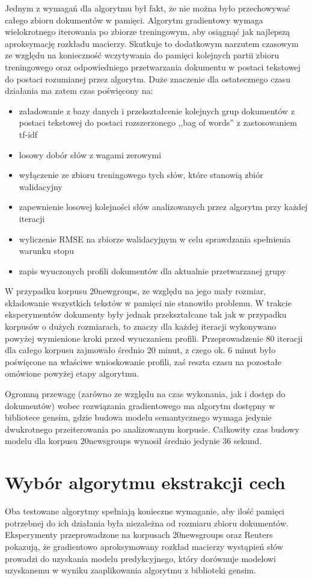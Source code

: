 \documentclass{pracamgr}
\begin{document}
Jednym  z  wymagań  dla  algorytmu  był  fakt,  że  nie  można  było  przechowywać  całego zbioru dokumentów w pamięci. Algorytm gradientowy wymaga wielokrotnego iterowania po zbiorze treningowym, aby osiągnąć jak najlepszą aproksymację rozkładu macierzy. Skutkuje to dodatkowym narzutem czasowym ze względu na konieczność wczytywania do pamięci kolejnych partii zbioru treningowego oraz odpowiedniego przetwarzania dokumentu w postaci tekstowej do postaci rozumianej przez algorytm. Duże znaczenie dla ostatecznego czasu działania ma zatem czas poświęcony na:

\begin{itemize}
    \item załadowanie z bazy danych i przekształcenie kolejnych grup dokumentów z postaci tekstowej do postaci rozszerzonego ,,bag of words'' z zastosowaniem tf-idf
    \item losowy dobór słów z wagami zerowymi
    \item wyłączenie ze zbioru treningowego tych słów, które stanowią zbiór walidacyjny
    \item zapewnienie losowej kolejności słów analizowanych przez algorytm przy każdej iteracji
    \item wyliczenie RMSE na zbiorze walidacyjnym w celu sprawdzania spełnienia warunku stopu
    \item zapis wyuczonych profili dokumentów dla aktualnie przetwarzanej grupy
\end{itemize}

W przypadku korpusu 20newgroups, ze względu na jego mały rozmiar, składowanie wszystkich tekstów w pamięci nie stanowiło problemu. W trakcie eksperymentów dokumenty były jednak przekształcane tak jak w przypadku korpusów o dużych rozmiarach, to znaczy dla każdej iteracji wykonywano powyżej wymienione kroki przed wyuczaniem profili. Przeprowadzenie 80 iteracji dla całego korpusu zajmowało średnio 20 minut, z czego ok. 6 minut było poświęcone na właściwe wnioskowanie profili, zaś reszta czasu na pozostałe omówione powyżej etapy algorytmu.

Ogromną przewagę (zarówno ze względu na czas wykonania, jak i dostęp do dokumentów) wobec rozwiązania gradientowego ma algorytm dostępny w bibliotece gensim, gdzie budowa modelu semantycznego wymaga jedynie dwukrotnego przeiterowania po analizowanym korpusie. Całkowity czas budowy modelu dla korpusu 20newsgroups wynosił średnio jedynie 36 sekund.

\section{Wybór algorytmu ekstrakcji cech}
Oba testowane algorytmy spełniają konieczne wymaganie, aby ilość pamięci potrzebnej do ich działania była niezależna od rozmiaru zbioru dokumentów. Eksperymenty przeprowadzone na korpusach 20newsgroups oraz Reuters pokazują, że gradientowo aproksymowany rozkład macierzy wystąpień słów prowadzi do uzyskania modelu predykcyjnego, który dorównuje modelowi uzyskanemu w wyniku zaaplikowania algorytmu z biblioteki gensim.
\end{document}
